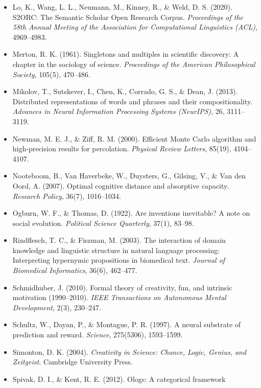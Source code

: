 \documentclass[a4paper,11pt]{article}
\begin{document}
\begin{itemize}
  Li, J., Yin, Y., Fortunato, S., \& Wang, D. (2019). A dataset of
  publication records for Nobel laureates. \emph{Scientific Data}, 6,
  33.
\item
  Lo, K., Wang, L. L., Neumann, M., Kinney, R., \& Weld, D. S. (2020).
  S2ORC: The Semantic Scholar Open Research Corpus. \emph{Proceedings of
  the 58th Annual Meeting of the Association for Computational
  Linguistics (ACL)}, 4969--4983.
\item
  Merton, R. K. (1961). Singletons and multiples in scientific
  discovery: A chapter in the sociology of science. \emph{Proceedings of
  the American Philosophical Society}, 105(5), 470--486.
\item
  Mikolov, T., Sutskever, I., Chen, K., Corrado, G. S., \& Dean, J.
  (2013). Distributed representations of words and phrases and their
  compositionality. \emph{Advances in Neural Information Processing
  Systems (NeurIPS)}, 26, 3111--3119.
\item
  Newman, M. E. J., \& Ziff, R. M. (2000). Efficient Monte Carlo
  algorithm and high-precision results for percolation. \emph{Physical
  Review Letters}, 85(19), 4104--4107.
\item
  Nooteboom, B., Van Haverbeke, W., Duysters, G., Gilsing, V., \& Van
  den Oord, A. (2007). Optimal cognitive distance and absorptive
  capacity. \emph{Research Policy}, 36(7), 1016--1034.
\item
  Ogburn, W. F., \& Thomas, D. (1922). Are inventions inevitable? A note
  on social evolution. \emph{Political Science Quarterly}, 37(1),
  83--98.
\item
  Rindflesch, T. C., \& Fiszman, M. (2003). The interaction of domain
  knowledge and linguistic structure in natural language processing:
  Interpreting hypernymic propositions in biomedical text. \emph{Journal
  of Biomedical Informatics}, 36(6), 462--477.
\item
  Schmidhuber, J. (2010). Formal theory of creativity, fun, and
  intrinsic motivation (1990--2010). \emph{IEEE Transactions on
  Autonomous Mental Development}, 2(3), 230--247.
\item
  Schultz, W., Dayan, P., \& Montague, P. R. (1997). A neural substrate
  of prediction and reward. \emph{Science}, 275(5306), 1593--1599.
\item
  Simonton, D. K. (2004). \emph{Creativity in Science: Chance, Logic,
  Genius, and Zeitgeist}. Cambridge University Press.
\item
  Spivak, D. I., \& Kent, R. E. (2012). Ologs: A categorical framework

\end{itemize}
\end{document}
